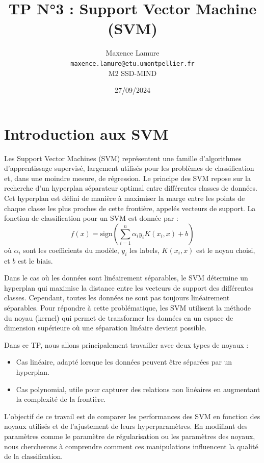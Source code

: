 \documentclass{scrartcl}
\title{TP N°3 : Support Vector Machine (SVM)}
\author{
  Maxence Lamure\\
  \texttt{maxence.lamure@etu.umontpellier.fr}\\
  M2 SSD-MIND
}
\date{27/09/2024}
\begin{document}
\maketitle

\section{Introduction aux SVM}
\hspace{7pt} Les Support Vector Machines (SVM) représentent une famille d'algorithmes d'apprentissage supervisé, largement utilisés pour les problèmes de classification et, dans une moindre mesure, de régression. Le principe des SVM repose sur la recherche d'un hyperplan séparateur optimal entre différentes classes de données. Cet hyperplan est défini de manière à maximiser la marge entre les points de chaque classe les plus proches de cette frontière, appelés vecteurs de support. La fonction de classification pour un SVM est donnée par :
\[
f(x) = \text{sign}\left(\sum_{i=1}^{n} \alpha_i y_i K(x_i, x) + b\right)
\]
où \(\alpha_i\) sont les coefficients du modèle, \(y_i\) les labels, \(K(x_i, x)\) est le noyau choisi, et \(b\) est le biais.\newline


Dans le cas où les données sont linéairement séparables, le SVM détermine un hyperplan qui maximise la distance entre les vecteurs de support des différentes classes. Cependant, toutes les données ne sont pas toujours linéairement séparables. Pour répondre à cette problématique, les SVM utilisent la méthode du noyau (kernel) qui permet de transformer les données en un espace de dimension supérieure où une séparation linéaire devient possible.\newline

Dans ce TP, nous allons principalement travailler avec deux types de noyaux :
\begin{itemize}
    \item Cas linéaire, adapté lorsque les données peuvent être séparées par un hyperplan.
    \item Cas polynomial, utile pour capturer des relations non linéaires en augmentant la complexité de la frontière.
\end{itemize}

L'objectif de ce travail est de comparer les performances des SVM en fonction des noyaux utilisés et de l'ajustement de leurs hyperparamètres. En modifiant des paramètres comme le paramètre de régularisation ou les paramètres des noyaux, nous chercherons à comprendre comment ces manipulations influencent la qualité de la classification.
\end{document}
